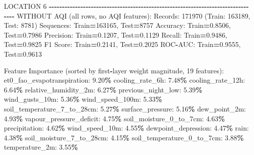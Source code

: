 \documentclass[
  letterpaper,
  DIV=11,
  numbers=noendperiod]{scrartcl}
\newenvironment{Shaded}{\begin{snugshade}}{\end{snugshade}}
\newcommand{\BuiltInTok}[1]{#1}
\newcommand{\DecValTok}[1]{\textcolor[rgb]{0.00,0.00,0.81}{#1}}
\newcommand{\FloatTok}[1]{\textcolor[rgb]{0.00,0.00,0.81}{#1}}
\newcommand{\NormalTok}[1]{#1}
\newcommand{\OperatorTok}[1]{\textcolor[rgb]{0.81,0.36,0.00}{\textbf{#1}}}
\begin{document}
\begin{Shaded}
\begin{Highlighting}[]
\NormalTok{LOCATION }\DecValTok{6}
\OperatorTok{{-}{-}{-}{-}{-}{-}{-}{-}{-}{-}{-}{-}{-}{-}{-}{-}{-}{-}{-}{-}{-}{-}{-}{-}{-}{-}{-}{-}{-}{-}{-}{-}{-}{-}{-}{-}{-}{-}{-}{-}{-}{-}{-}{-}{-}{-}{-}{-}{-}{-}{-}{-}{-}{-}{-}{-}{-}{-}{-}{-}{-}{-}{-}{-}{-}{-}{-}{-}{-}{-}{-}{-}{-}{-}{-}{-}{-}{-}{-}{-}}
\NormalTok{WITHOUT AQI (}\BuiltInTok{all}\NormalTok{ rows, no AQI features):}
\NormalTok{  Records: }\DecValTok{171970}\NormalTok{ (Train: }\DecValTok{163189}\NormalTok{, Test: }\DecValTok{8781}\NormalTok{)}
\NormalTok{  Sequences: Train}\OperatorTok{=}\DecValTok{163165}\NormalTok{, Test}\OperatorTok{=}\DecValTok{8757}
\NormalTok{  Accuracy: Train}\OperatorTok{=}\FloatTok{0.8506}\NormalTok{, Test}\OperatorTok{=}\FloatTok{0.7986}
\NormalTok{  Precision: Train}\OperatorTok{=}\FloatTok{0.1207}\NormalTok{, Test}\OperatorTok{=}\FloatTok{0.1129}
\NormalTok{  Recall: Train}\OperatorTok{=}\FloatTok{0.9486}\NormalTok{, Test}\OperatorTok{=}\FloatTok{0.9825}
\NormalTok{  F1 Score: Train}\OperatorTok{=}\FloatTok{0.2141}\NormalTok{, Test}\OperatorTok{=}\FloatTok{0.2025}
\NormalTok{  ROC}\OperatorTok{{-}}\NormalTok{AUC: Train}\OperatorTok{=}\FloatTok{0.9555}\NormalTok{, Test}\OperatorTok{=}\FloatTok{0.9613}

\NormalTok{  Feature Importance (}\BuiltInTok{sorted}\NormalTok{ by first}\OperatorTok{{-}}\NormalTok{layer weight magnitude, }\DecValTok{19}\NormalTok{ features):}
\NormalTok{    et0\_fao\_evapotranspiration: }\FloatTok{9.20}\OperatorTok{\%}
\NormalTok{    cooling\_rate\_6h: }\FloatTok{7.48}\OperatorTok{\%}
\NormalTok{    cooling\_rate\_12h: }\FloatTok{6.64}\OperatorTok{\%}
\NormalTok{    relative\_humidity\_2m: }\FloatTok{6.27}\OperatorTok{\%}
\NormalTok{    previous\_night\_low: }\FloatTok{5.39}\OperatorTok{\%}
\NormalTok{    wind\_gusts\_10m: }\FloatTok{5.36}\OperatorTok{\%}
\NormalTok{    wind\_speed\_100m: }\FloatTok{5.33}\OperatorTok{\%}
\NormalTok{    soil\_temperature\_7\_to\_28cm: }\FloatTok{5.27}\OperatorTok{\%}
\NormalTok{    surface\_pressure: }\FloatTok{5.16}\OperatorTok{\%}
\NormalTok{    dew\_point\_2m: }\FloatTok{4.93}\OperatorTok{\%}
\NormalTok{    vapour\_pressure\_deficit: }\FloatTok{4.75}\OperatorTok{\%}
\NormalTok{    soil\_moisture\_0\_to\_7cm: }\FloatTok{4.63}\OperatorTok{\%}
\NormalTok{    precipitation: }\FloatTok{4.62}\OperatorTok{\%}
\NormalTok{    wind\_speed\_10m: }\FloatTok{4.55}\OperatorTok{\%}
\NormalTok{    dewpoint\_depression: }\FloatTok{4.47}\OperatorTok{\%}
\NormalTok{    rain: }\FloatTok{4.38}\OperatorTok{\%}
\NormalTok{    soil\_moisture\_7\_to\_28cm: }\FloatTok{4.15}\OperatorTok{\%}
\NormalTok{    soil\_temperature\_0\_to\_7cm: }\FloatTok{3.88}\OperatorTok{\%}
\NormalTok{    temperature\_2m: }\FloatTok{3.55}\OperatorTok{\%}


\end{Highlighting}
\end{Shaded}
\end{document}
